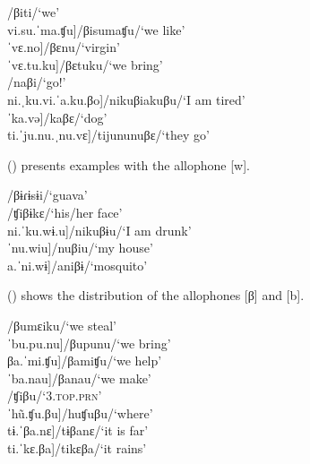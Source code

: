 \ea\label{ex:b-1}
\ea    \tab[ˈvi.ti]\tab\tab\tab /βiti/\tab\tab\tab ‘we’\\
    \tab{[}vi.su.ˈma.ʧu]\tab /βisumaʧu/\tab\tab ‘we like’\\
    \tab{[}ˈvɛ.no]\tab\tab /βɛnu/\tab\tab ‘virgin’\\
    \tab{[}ˈvɛ.tu.ku]\tab\tab /βɛtuku/\tab\tab ‘we bring’\\
\ex    \tab[ˈna.vi]\tab\tab /naβi/\tab\tab\tab ‘go!’\\
   \tab{[}ni.ˌku.vi.ˈa.ku.βo]\tab /nikuβiakuβu/\tab ‘I am tired’\\
   \tab{[}ˈka.və]\tab\tab /kaβɛ/\tab\tab\tab ‘dog’\\
   \tab{[}ti.ˈju.nu.ˌnu.vɛ]\tab /tijununuβɛ/\tab\tab ‘they go’\\%
\z
\xe

() presents examples with the allophone [w].
    
\ea\label{ex:b-2}
\ea    {}\tab /βɨɾɨsɨi/\tab ‘guava’\\
\ex    \tab[ʧi.ˈwɨ.kɛ]\tab /ʧiβɨkɛ/\tab ‘his/her face’\\
   \tab{[}ni.ˈku.wɨ.u]\tab /nikuβɨu/\tab ‘I am drunk’\\
   \tab{[}ˈnu.wiu]\tab /nuβiu/\tab ‘my house’\\
    \tab{[}a.ˈni.wɨ]\tab /aniβɨ/\tab ‘mosquito’\\%
\z
\xe

() shows the distribution of the allophones [β] and [b].

\ea\label{ex:b-3}
\ea    \tab[βu.ˈmɛi.ku]\tab /βumɛiku/\tab ‘we steal’\\
   \tab{[}ˈbu.pu.nu]\tab /βupunu/\tab ‘we bring’\\
   \tab{[}βa.ˈmi.ʧu]\tab /βamiʧu/\tab ‘we help’\\
   \tab{[}ˈba.nau]\tab /βanau/\tab ‘we make’\\
\ex    \tab[ˈʧi.bʊ]\tab /ʧiβu/\tab\tab ‘3.\textsc{top.prn}’\\
   \tab{[}ˈhũ.ʧu.βu]\tab /huʧuβu/\tab ‘where’\\
   \tab{[}tɨ.ˈβa.nɛ]\tab /tɨβanɛ/\tab ‘it is far’\\
   \tab{[}ti.ˈkɛ.βa]\tab /tikɛβa/\tab ‘it rains’\\%
\z
\xe

